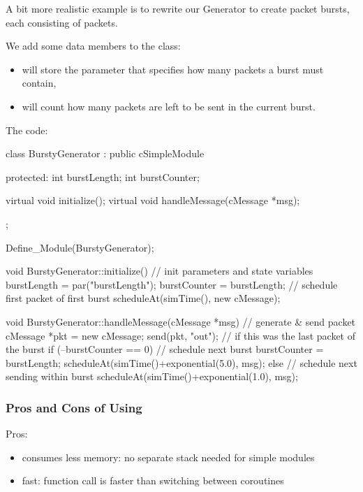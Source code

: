 A bit more realistic example is to rewrite our Generator to create
packet bursts, each consisting of  packets.

We add some data members to the class:
\begin{itemize}
\item {} will store the parameter that specifies how many
    packets a burst must contain,
\item {} will count how many packets are left to be sent
    in the current burst.
\end{itemize}

The code:

\begin{cpp}
class BurstyGenerator : public cSimpleModule
{
  protected:
    int burstLength;
    int burstCounter;

    virtual void initialize();
    virtual void handleMessage(cMessage *msg);
};

Define_Module(BurstyGenerator);

void BurstyGenerator::initialize()
{
    // init parameters and state variables
    burstLength = par("burstLength");
    burstCounter = burstLength;
    // schedule first packet of first burst
    scheduleAt(simTime(), new cMessage);
}

void BurstyGenerator::handleMessage(cMessage *msg)
{
    // generate & send packet
    cMessage *pkt = new cMessage;
    send(pkt, "out");
    // if this was the last packet of the burst
    if (--burstCounter == 0) {
        // schedule next burst
        burstCounter = burstLength;
        scheduleAt(simTime()+exponential(5.0), msg);
    }
    else {
        // schedule next sending within burst
        scheduleAt(simTime()+exponential(1.0), msg);
    }
}
\end{cpp}



\subsubsection{Pros and Cons of Using }
\label{sec:simple-modules:handlemessage:pros-and-cons}

Pros:
\begin{itemize}
  \item consumes less memory: no separate stack needed for simple modules
  \item fast: function call is faster than switching between coroutines
\end{itemize}

